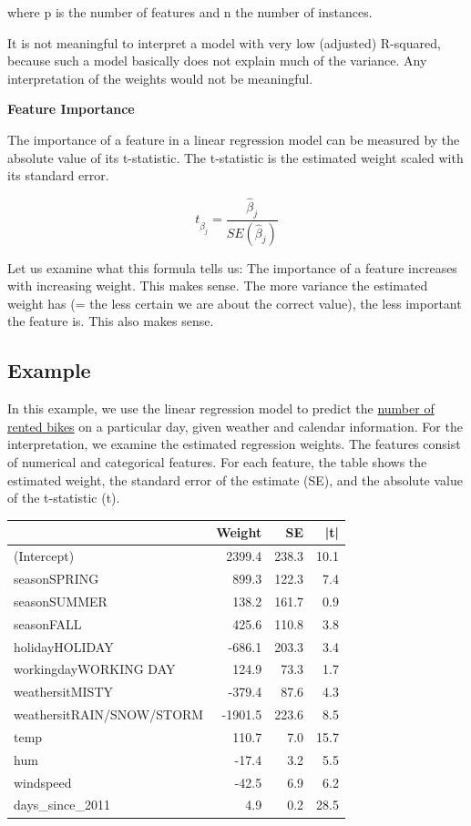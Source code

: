 \documentclass[
  11pt,
]{scrbook}
\begin{document}
where p is the number of features and n the number of instances.

It is not meaningful to interpret a model with very low (adjusted) R-squared, because such a model basically does not explain much of the variance.
Any interpretation of the weights would not be meaningful.

\textbf{Feature Importance}

The importance of a feature in a linear regression model can be measured by the absolute value of its t-statistic.
The t-statistic is the estimated weight scaled with its standard error.

\[t_{\hat{\beta}_j}=\frac{\hat{\beta}_j}{SE(\hat{\beta}_j)}\]

Let us examine what this formula tells us:
The importance of a feature increases with increasing weight.
This makes sense.
The more variance the estimated weight has (= the less certain we are about the correct value), the less important the feature is.
This also makes sense.

\hypertarget{example}{%
\subsection{Example}\label{example}}

In this example, we use the linear regression model to predict the \protect\hyperlink{bike-data}{number of rented bikes} on a particular day, given weather and calendar information.
For the interpretation, we examine the estimated regression weights.
The features consist of numerical and categorical features.
For each feature, the table shows the estimated weight, the standard error of the estimate (SE), and the absolute value of the t-statistic (\textbar t\textbar).

\begin{table}
\centering
\begin{tabular}{lrrr}
\toprule
  & Weight & SE & |t|\\
\midrule
(Intercept) & 2399.4 & 238.3 & 10.1\\
seasonSPRING & 899.3 & 122.3 & 7.4\\
seasonSUMMER & 138.2 & 161.7 & 0.9\\
seasonFALL & 425.6 & 110.8 & 3.8\\
holidayHOLIDAY & -686.1 & 203.3 & 3.4\\
\addlinespace
workingdayWORKING DAY & 124.9 & 73.3 & 1.7\\
weathersitMISTY & -379.4 & 87.6 & 4.3\\
weathersitRAIN/SNOW/STORM & -1901.5 & 223.6 & 8.5\\
temp & 110.7 & 7.0 & 15.7\\
hum & -17.4 & 3.2 & 5.5\\
\addlinespace
windspeed & -42.5 & 6.9 & 6.2\\
days\_since\_2011 & 4.9 & 0.2 & 28.5\\
\bottomrule
\end{tabular}
\end{table}
\end{document}
